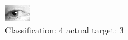 \begin{figure}[h!]
\begin{center}
\includegraphics[width=0.60\columnwidth]{figures/ID1408_class_4_target_3.png}
\end{center}
\caption{ Classification: 4 actual target: 3}
\label{fig:ID1408_class_4_target_3}
\end{figure}
